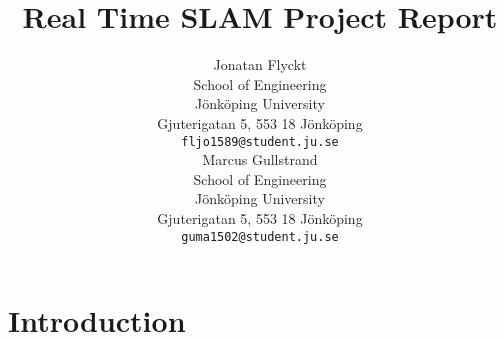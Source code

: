 \documentclass{article}
\title{Real Time SLAM Project Report}
\author{
 Jonatan Flyckt \\
  School of Engineering\\
  Jönköping University\\
  Gjuterigatan 5, 553 18 Jönköping \\
  \texttt{fljo1589@student.ju.se} \\
   \And
 Marcus Gullstrand \\
  School of Engineering\\
  Jönköping University\\
  Gjuterigatan 5, 553 18 Jönköping \\
  \texttt{guma1502@student.ju.se} \\
}
\begin{document}
\maketitle
\begin{abstract}
\end{abstract}

\section{Introduction}
\cite{test}

  


\end{document}
